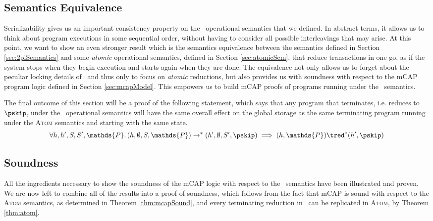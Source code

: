 \subsection{Semantics Equivalence}

\label{sec:semEquiv}

Serializability gives us an important consistency property on the \tpl\ operational semantics that we defined. In abstract terms, it allows us to think about program executions in some sequential order, without having to consider all possible interleavings that may arise. At this point, we want to show an even stronger result which is the semantics equivalence between the semantics defined in Section \ref{sec:2plSemantics} and some \textit{atomic} operational semantics, defined in Section \ref{sec:atomicSem}, that reduce transactions in one go, as if the system stops when they begin execution and starts again when they are done. The equivalence not only allows us to forget about the peculiar locking details of \tpl\ and thus only to focus on \textit{atomic} reductions, but also provides us with soundness with respect to the mCAP program logic defined in Section \ref{sec:mcapModel}. This empowers us to build mCAP proofs of programs running under the \tpl\ semantics.

The final outcome of this section will be a proof of the following statement, which says that any program that terminates, i.e. reduces to $\pskip$, under the \tpl\ operational semantics will have the same overall effect on the global storage as the same terminating program running under the \textsc{Atom} semantics and starting with the same state.
\[
	\forall h, h', S, S', \mathds{P} \ldotp
	(h, \emptyset, S, \mathds{P}) \rightarrow^* (h', \emptyset, S', \pskip) \implies 
	(h, \mathds{P}) \tred^* (h', \pskip)
\]









\subsection{Soundness}

All the ingredients necessary to show the soundness of the mCAP logic with respect to the \tpl\ semantics have been illustrated and proven. We are now left to combine all of the results into a proof of soundness, which follows from the fact that mCAP is sound with respect to the \textsc{Atom} semantics, as determined in Theorem \ref{thm:mcapSound}, and every terminating reduction in \tpl\ can be replicated in \textsc{Atom}, by Theorem \ref{thm:atom}.

